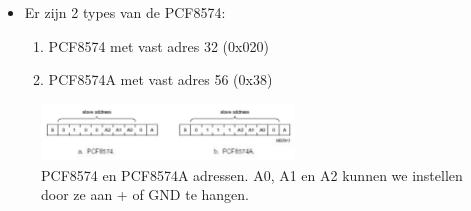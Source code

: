 \documentclass{article}
\begin{document}
\begin{itemize}
    \item Er zijn 2 types van de PCF8574:
    \begin{enumerate}
        \item PCF8574 met vast adres 32 (0x020)
        \item PCF8574A met vast adres 56 (0x38)
    \end{enumerate}
\end{itemize}

\begin{figure}[H]
    \centering
    \includegraphics[width=0.6\textwidth]{pcf-adres.png}
    \caption{PCF8574 en PCF8574A adressen. A0, A1 en A2 kunnen we instellen door ze aan + of GND te hangen.}
\end{figure}
\end{document}
